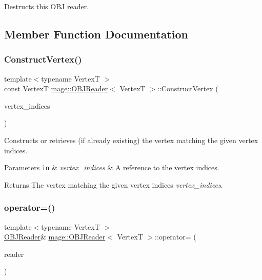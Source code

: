 Destructs this O\+BJ reader. 

\subsection{Member Function Documentation}
\hypertarget{classmage_1_1_o_b_j_reader_aa899d5657f913d488cc748fd49ccee60}{}\label{classmage_1_1_o_b_j_reader_aa899d5657f913d488cc748fd49ccee60} 
\subsubsection{\texorpdfstring{Construct\+Vertex()}{ConstructVertex()}}
{\footnotesize\ttfamily template$<$typename VertexT $>$ \\
const VertexT \hyperlink{classmage_1_1_o_b_j_reader}{mage\+::\+O\+B\+J\+Reader}$<$ VertexT $>$\+::Construct\+Vertex (\begin{DoxyParamCaption}\item[{const X\+M\+U\+I\+N\+T3 \&}]{vertex\+\_\+indices }\end{DoxyParamCaption})\hspace{0.3cm}{\ttfamily [private]}}

Constructs or retrieves (if already existing) the vertex matching the given vertex indices.


\begin{DoxyParams}[1]{Parameters}
\mbox{\tt in}  & {\em vertex\+\_\+indices} & A reference to the vertex indices. \\
\hline
\end{DoxyParams}
\begin{DoxyReturn}{Returns}
The vertex matching the given vertex indices {\itshape vertex\+\_\+indices}. 
\end{DoxyReturn}
\hypertarget{classmage_1_1_o_b_j_reader_a62e516060267f828c5aa1a3f23dcf55d}{}\label{classmage_1_1_o_b_j_reader_a62e516060267f828c5aa1a3f23dcf55d} 
\subsubsection{\texorpdfstring{operator=()}{operator=()}\hspace{0.1cm}{\footnotesize\ttfamily [1/2]}}
{\footnotesize\ttfamily template$<$typename VertexT $>$ \\
\hyperlink{classmage_1_1_o_b_j_reader}{O\+B\+J\+Reader}\& \hyperlink{classmage_1_1_o_b_j_reader}{mage\+::\+O\+B\+J\+Reader}$<$ VertexT $>$\+::operator= (\begin{DoxyParamCaption}\item[{const \hyperlink{classmage_1_1_o_b_j_reader}{O\+B\+J\+Reader}$<$ VertexT $>$ \&}]{reader }\end{DoxyParamCaption})\hspace{0.3cm}{\ttfamily [delete]}}


